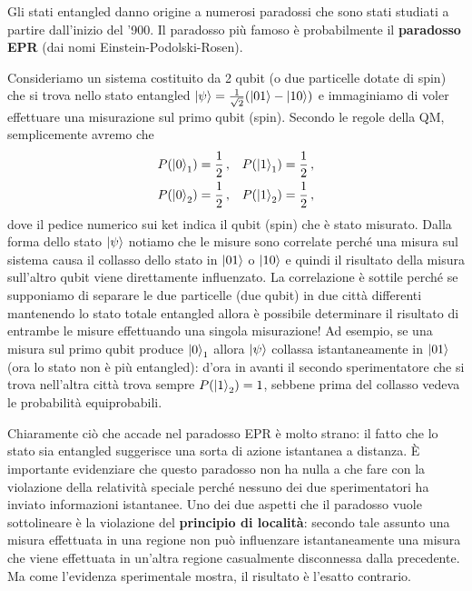 \noindent Gli stati entangled danno origine a numerosi paradossi che sono stati studiati a partire dall'inizio del '900. Il paradosso più famoso è probabilmente il \textbf{paradosso EPR} (dai nomi Einstein-Podolski-Rosen). 
\begin{esempio}
    Consideriamo un sistema costituito da 2 qubit (o due particelle dotate di spin) che si trova nello stato entangled $\ket{\psi} = \frac{1}{\sqrt{2}} (\ket{01} - \ket{10})$ e immaginiamo di voler effettuare una misurazione sul primo qubit (spin). Secondo le regole della QM, semplicemente avremo che
    \begin{align*}
        P(\ket{0}_1) &= \frac{1}{2} \, , &P(\ket{1}_1) &= \frac{1}{2} \, , \\
        P(\ket{0}_2) &= \frac{1}{2} \, , &P(\ket{1}_2) &= \frac{1}{2} \, ,
    \end{align*}
    dove il pedice numerico sui ket indica il qubit (spin) che è stato misurato. Dalla forma dello stato $\ket{\psi}$ notiamo che le misure sono correlate perché una misura sul sistema causa il collasso dello stato in $\ket{01}$ o $\ket{10}$ e quindi il risultato della misura sull'altro qubit viene direttamente influenzato. La correlazione è sottile perché se supponiamo di separare le due particelle (due qubit) in due città differenti mantenendo lo stato totale entangled allora è possibile determinare il risultato di entrambe le misure effettuando una singola misurazione! Ad esempio, se una misura sul primo qubit produce $\ket{0}_1$ allora $\ket{\psi}$ collassa istantaneamente in $\ket{01}$ (ora lo stato non è più entangled): d'ora in avanti il secondo sperimentatore che si trova nell'altra città trova sempre $P(\ket{1}_2) = 1$, sebbene prima del collasso vedeva le probabilità equiprobabili.
\end{esempio}

\noindent Chiaramente ciò che accade nel paradosso EPR è molto strano: il fatto che lo stato sia entangled suggerisce una sorta di azione istantanea a distanza. È importante evidenziare che questo paradosso non ha nulla a che fare con la violazione della relatività speciale perché nessuno dei due sperimentatori ha inviato informazioni istantanee. Uno dei due aspetti che il paradosso vuole sottolineare è la violazione del \textbf{principio di località}: secondo tale assunto una misura effettuata in una regione non può influenzare istantaneamente una misura che viene effettuata in un'altra regione casualmente disconnessa dalla precedente. Ma come l'evidenza sperimentale mostra, il risultato è l'esatto contrario.